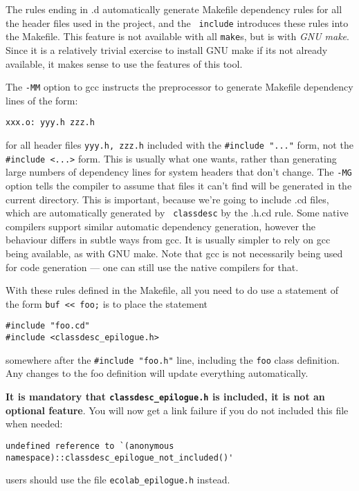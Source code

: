 The rules ending in .d automatically generate Makefile dependency
rules for all the header files used in the project, and the {\tt
  include} introduces these rules into the Makefile. This feature is
not available with all {\tt make}s, but is with {\em GNU make}. Since
it is a relatively trivial exercise to install GNU make if its not
already available, it makes sense to use the features of this tool.

The {\tt -MM} option to gcc instructs the preprocessor to generate
Makefile dependency lines of the form:
\begin{verbatim}
xxx.o: yyy.h zzz.h
\end{verbatim}
for all header files {\tt yyy.h, zzz.h} included with the
\verb+#include "..."+ form, not the \verb+#include <...>+ form. This
is usually what one wants, rather than generating large numbers of
dependency lines for system headers that don't change. The {\tt -MG}
option tells the compiler to assume that files it can't find will be
generated in the current directory. This is important, because we're
going to include .cd files, which are automatically generated by {\tt
  classdesc} by the .h.cd rule.
Some native compilers support similar automatic dependency generation,
however the behaviour differs in subtle ways from gcc. It is usually
simpler to rely on gcc being available, as with GNU make. Note that
gcc is not necessarily being used for code generation --- one can
still use the native compilers for that.

With these rules defined in the Makefile, all you need to do use a
statement of the form \verb+buf << foo;+ is to place the statement 
\begin{verbatim}
#include "foo.cd"
#include <classdesc_epilogue.h>
\end{verbatim}
somewhere after the \verb+#include "foo.h"+ line, including the
{\tt foo} class definition. Any changes to the foo definition will
update everything automatically.

{\bf It is mandatory that \verb+classdesc_epilogue.h+ is included, it is not
  an optional feature}. You will now get a link failure if you do not
included this file when needed:
\begin{verbatim}
undefined reference to `(anonymous namespace)::classdesc_epilogue_not_included()'
\end{verbatim}
\EcoLab{} users should use the file
  \verb+ecolab_epilogue.h+ instead.

\label{library-method} 

